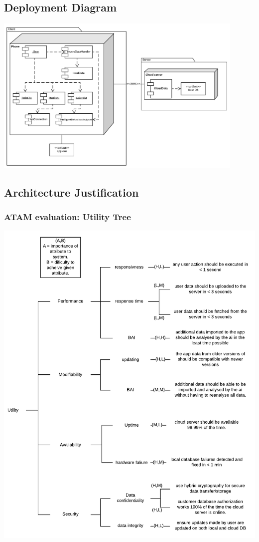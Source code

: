 \documentclass[a4paper,11pt]{article} %
\begin{document}
\subsection{Deployment Diagram}
\begin{center}
    \includegraphics[width=0.9\textwidth]{img/Deployment_Diagram.pdf}
\end{center}
\newpage

\subsection{Architecture Justification}
\subsubsection{ATAM evaluation: Utility Tree}
\begin{center}
    \includegraphics[width=\textwidth]{img/Utility_Tree.pdf}
\end{center}
\newpage
\end{document}

